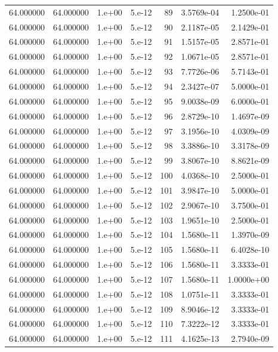 \begin{table}[htbp]
\begin{tabular}{rrrrrrr}
64.000000 & 64.000000 & 1.e+00 & 5.e-12 & 89 & 3.5769e-04 & 1.2500e-01 \\
64.000000 & 64.000000 & 1.e+00 & 5.e-12 & 90 & 2.1187e-05 & 2.1429e-01 \\
64.000000 & 64.000000 & 1.e+00 & 5.e-12 & 91 & 1.5157e-05 & 2.8571e-01 \\
64.000000 & 64.000000 & 1.e+00 & 5.e-12 & 92 & 1.0671e-05 & 2.8571e-01 \\
64.000000 & 64.000000 & 1.e+00 & 5.e-12 & 93 & 7.7726e-06 & 5.7143e-01 \\
64.000000 & 64.000000 & 1.e+00 & 5.e-12 & 94 & 2.3427e-07 & 5.0000e-01 \\
64.000000 & 64.000000 & 1.e+00 & 5.e-12 & 95 & 9.0038e-09 & 6.0000e-01 \\
64.000000 & 64.000000 & 1.e+00 & 5.e-12 & 96 & 2.8729e-10 & 1.4697e-09 \\
64.000000 & 64.000000 & 1.e+00 & 5.e-12 & 97 & 3.1956e-10 & 4.0309e-09 \\
64.000000 & 64.000000 & 1.e+00 & 5.e-12 & 98 & 3.3886e-10 & 3.3178e-09 \\
64.000000 & 64.000000 & 1.e+00 & 5.e-12 & 99 & 3.8067e-10 & 8.8621e-09 \\
64.000000 & 64.000000 & 1.e+00 & 5.e-12 & 100 & 4.0368e-10 & 2.5000e-01 \\
64.000000 & 64.000000 & 1.e+00 & 5.e-12 & 101 & 3.9847e-10 & 5.0000e-01 \\
64.000000 & 64.000000 & 1.e+00 & 5.e-12 & 102 & 2.9067e-10 & 3.7500e-01 \\
64.000000 & 64.000000 & 1.e+00 & 5.e-12 & 103 & 1.9651e-10 & 2.5000e-01 \\
64.000000 & 64.000000 & 1.e+00 & 5.e-12 & 104 & 1.5680e-11 & 1.3970e-09 \\
64.000000 & 64.000000 & 1.e+00 & 5.e-12 & 105 & 1.5680e-11 & 6.4028e-10 \\
64.000000 & 64.000000 & 1.e+00 & 5.e-12 & 106 & 1.5680e-11 & 3.3333e-01 \\
64.000000 & 64.000000 & 1.e+00 & 5.e-12 & 107 & 1.5680e-11 & 1.0000e+00 \\
64.000000 & 64.000000 & 1.e+00 & 5.e-12 & 108 & 1.0751e-11 & 3.3333e-01 \\
64.000000 & 64.000000 & 1.e+00 & 5.e-12 & 109 & 8.9046e-12 & 3.3333e-01 \\
64.000000 & 64.000000 & 1.e+00 & 5.e-12 & 110 & 7.3222e-12 & 3.3333e-01 \\
64.000000 & 64.000000 & 1.e+00 & 5.e-12 & 111 & 4.1625e-13 & 2.7940e-09 \\

\end{tabular}
\end{table}
